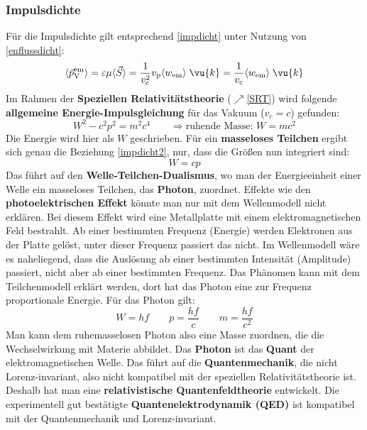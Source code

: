 	  \subsubsection{Impulsdichte}
	  	Für die Impulsdichte gilt entsprechend \ref{impdicht} unter Nutzung von \ref{enflussdicht}:
	  	\begin{equation}\label{impdicht2}
	  		\langle\vec{p}_\text{V}^\mathrm{em} \rangle= \varepsilon\mu\langle\vec{S}\rangle = \frac{1}{ v_\mathrm{c}^2}  v_\mathrm{p} \langle   w_\mathrm{em}\rangle\; \vu{k} = \frac{1}{ v_\mathrm{c}} \langle   w_\mathrm{em}\rangle\; \vu{k}
	  	\end{equation}
	  	Im Rahmen der \textbf{Speziellen Relativitätstheorie} ($\nearrow$\ref{SRT}) wird folgende \textbf{allgemeine Energie-Impulsgleichung} für das Vakuum (\( v_\mathrm{c} = c \)) gefunden:
	  	\begin{equation}
	  		\boxed{ W ^2 - c^2p^2 = m^2c^4}\quad \quad \Rightarrow\text{ruhende Masse: }  W  = mc^2
	  	\end{equation}
	  	Die Energie wird hier als $W$ geschrieben. Für ein \textbf{masseloses Teilchen} ergibt sich genau die Beziehung \ref{impdicht2}, nur, dass die Größen nun integriert sind:
	  	\begin{equation}
	  		\boxed{ W  =   c p }
	  	\end{equation}
	  	Das führt auf den \textbf{Welle-Teilchen-Dualismus}, wo man der Energieeinheit einer Welle ein masseloses Teilchen, das  \textbf{Photon}, zuordnet. Effekte wie den \textbf{photoelektrischen Effekt} könnte man nur mit dem Wellenmodell nicht erklären. Bei diesem Effekt wird eine Metallplatte mit einem elektromagnetischen Feld bestrahlt. Ab einer bestimmten Frequenz (Energie) werden Elektronen aus der Platte gelöst, unter dieser Frequenz passiert das nicht. Im Wellenmodell wäre es naheliegend, dass die Auslösung ab einer bestimmten Intensität (Amplitude) passiert, nicht aber ab einer bestimmten Frequenz. Das Phänomen kann mit dem Teilchenmodell erklärt werden, dort hat das Photon eine zur Frequenz proportionale Energie. Für das Photon gilt:
	  	\begin{equation}
	  		W=hf \quad \quad p=\frac{hf}{c} \quad\quad m=\frac{hf}{c^2}
	  	\end{equation}
	  	 Man kann dem ruhemasselosen Photon also eine Masse zuordnen, die die Wechselwirkung mit Materie abbildet. Das \textbf{Photon} ist das \textbf{Quant} der elektromagnetischen Welle. Das führt auf die \textbf{Quantenmechanik}, die nicht Lorenz-invariant, also nicht kompatibel mit der speziellen Relativitätstheorie ist. Deshalb hat man eine \textbf{relativistische Quantenfeldtheorie} entwickelt. Die experimentell gut bestätigte \textbf{Quantenelektrodynamik (QED)} ist kompatibel mit der Quantenmechanik und Lorenz-invariant. 
